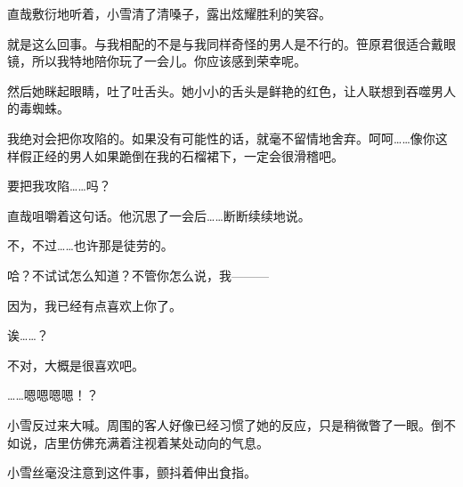直哉敷衍地听着，小雪清了清嗓子，露出炫耀胜利的笑容。

就是这么回事。与我相配的不是与我同样奇怪的男人是不行的。笹原君很适合戴眼镜，所以我特地陪你玩了一会儿。你应该感到荣幸呢。

然后她眯起眼睛，吐了吐舌头。她小小的舌头是鲜艳的红色，让人联想到吞噬男人的毒蜘蛛。

我绝对会把你攻陷的。如果没有可能性的话，就毫不留情地舍弃。呵呵……像你这样假正经的男人如果跪倒在我的石榴裙下，一定会很滑稽吧。

要把我攻陷……吗？

直哉咀嚼着这句话。他沉思了一会后……断断续续地说。

不，不过……也许那是徒劳的。

哈？不试试怎么知道？不管你怎么说，我———

因为，我已经有点喜欢上你了。

诶……？

不对，大概是很喜欢吧。

……嗯嗯嗯嗯！？

小雪反过来大喊。周围的客人好像已经习惯了她的反应，只是稍微瞥了一眼。倒不如说，店里仿佛充满着注视着某处动向的气息。

小雪丝毫没注意到这件事，颤抖着伸出食指。

